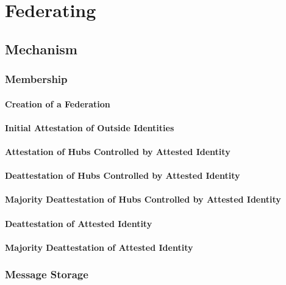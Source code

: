 \chapter{Federating}

\section{Mechanism}

\subsection{Membership}

\subsubsection{Creation of a Federation}

\subsubsection{Initial Attestation of Outside Identities}

\subsubsection{Attestation of Hubs Controlled by Attested Identity}

\subsubsection{Deattestation of Hubs Controlled by Attested Identity}

\subsubsection{Majority Deattestation of Hubs Controlled by Attested Identity}

\subsubsection{Deattestation of Attested Identity}

\subsubsection{Majority Deattestation of Attested Identity}

\subsection{Message Storage}

